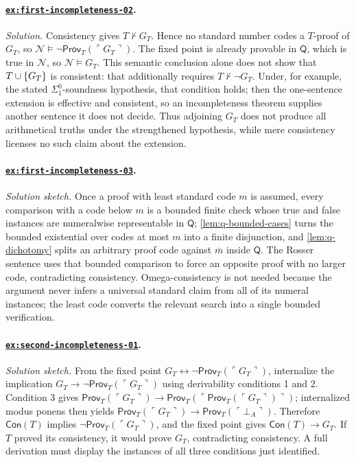 \documentclass[11pt,oneside,openany]{book}
\theoremstyle{definition}
\theoremstyle{plain}
\theoremstyle{remark}
\DeclarePairedDelimiter{\set}{\lbrace}{\rbrace}
\newcommand{\entails}{\models}
\newcommand{\notderives}{\not\vdash}
\newcommand{\bottom}{\bot}
\begin{document}
\paragraph{\hyperref[ex:first-incompleteness-02]{\texttt{ex:first-incompleteness-02}}.}
\textit{Solution.}  Consistency gives \(T\notderives G_T\).  Hence no standard
number codes a \(T\)-proof of \(G_T\), so
\(\mathcal N\entails\neg\mathsf{Prov}_T(\ulcorner G_T\urcorner)\).  The fixed
point is already provable in \(\mathsf Q\), which is true in \(\mathcal N\),
so \(\mathcal N\entails G_T\).  This semantic conclusion alone does not show
that \(T\cup\set{G_T}\) is consistent: that additionally requires
\(T\notderives\neg G_T\).  Under, for example, the stated
\(\Sigma^0_1\)-soundness hypothesis, that condition holds; then the one-sentence
extension is effective and consistent, so an incompleteness theorem supplies
another sentence it does not decide.  Thus adjoining \(G_T\) does not produce
all arithmetical truths under the strengthened hypothesis, while mere
consistency licenses no such claim about the extension.

\paragraph{\hyperref[ex:first-incompleteness-03]{\texttt{ex:first-incompleteness-03}}.}
\textit{Solution sketch.}  Once a proof with least standard code \(m\) is
assumed, every comparison with a code below \(m\) is a bounded finite check
whose true and false instances are numeralwise representable in \(\mathsf Q\);
\cref{lem:q-bounded-cases} turns the bounded existential over codes at most
\(m\) into a finite disjunction, and \cref{lem:q-dichotomy} splits an
arbitrary proof code against \(\bar m\) inside \(\mathsf Q\).
The Rosser sentence uses that bounded comparison to force an opposite proof
with no larger code, contradicting consistency.  Omega-consistency is not
needed because the argument never infers a universal standard claim from all
of its numeral instances; the least code converts the relevant search into a
single bounded verification.

\paragraph{\hyperref[ex:second-incompleteness-01]{\texttt{ex:second-incompleteness-01}}.}
\textit{Solution sketch.}  From the fixed point
\(G_T\leftrightarrow\neg\mathsf{Prov}_T(\ulcorner G_T\urcorner)\), internalize
the implication \(G_T\to\neg\mathsf{Prov}_T(\ulcorner G_T\urcorner)\) using
derivability conditions 1 and 2.  Condition 3 gives
\(\mathsf{Prov}_T(\ulcorner G_T\urcorner)\to
\mathsf{Prov}_T(\ulcorner
  \mathsf{Prov}_T(\ulcorner G_T\urcorner)\urcorner)\); internalized
modus ponens then yields
\(\mathsf{Prov}_T(\ulcorner G_T\urcorner)\to
\mathsf{Prov}_T(\ulcorner\bottom_A\urcorner)\).  Therefore
\(\mathsf{Con}(T)\) implies
\(\neg\mathsf{Prov}_T(\ulcorner G_T\urcorner)\), and the fixed point
gives \(\mathsf{Con}(T)\to G_T\).  If \(T\) proved its consistency, it would
prove \(G_T\), contradicting consistency.  A full derivation must display the
instances of all three conditions just identified.
\end{document}
